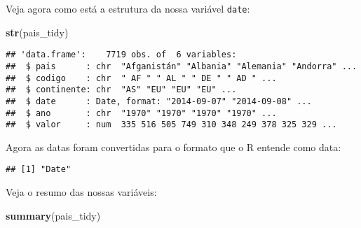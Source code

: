 \documentclass[]{book}
\newenvironment{Shaded}{\begin{snugshade}}{\end{snugshade}}
\newcommand{\KeywordTok}[1]{\textcolor[rgb]{0.13,0.29,0.53}{\textbf{#1}}}
\newcommand{\NormalTok}[1]{#1}
\newcommand{\OperatorTok}[1]{\textcolor[rgb]{0.81,0.36,0.00}{\textbf{#1}}}
\newcommand{\StringTok}[1]{\textcolor[rgb]{0.31,0.60,0.02}{#1}}
\theoremstyle{definition}
\theoremstyle{definition}
\theoremstyle{definition}
\theoremstyle{remark}
\begin{document}
\begin{Shaded}
\end{Shaded}

Veja agora como está a estrutura da nossa variável \texttt{date}:

\begin{Shaded}
\begin{Highlighting}[]
\KeywordTok{str}\NormalTok{(pais_tidy)}
\end{Highlighting}
\end{Shaded}

\begin{verbatim}
## 'data.frame':    7719 obs. of  6 variables:
##  $ pais      : chr  "Afganistán" "Albania" "Alemania" "Andorra" ...
##  $ codigo    : chr  " AF " " AL " " DE " " AD " ...
##  $ continente: chr  "AS" "EU" "EU" "EU" ...
##  $ date      : Date, format: "2014-09-07" "2014-09-08" ...
##  $ ano       : chr  "1970" "1970" "1970" "1970" ...
##  $ valor     : num  335 516 505 749 310 348 249 378 325 329 ...
\end{verbatim}

Agora as datas foram convertidas para o formato que o R entende como data:

\begin{Shaded}
\end{Shaded}

\begin{verbatim}
## [1] "Date"
\end{verbatim}

Veja o resumo das nossas variáveis:

\begin{Shaded}
\begin{Highlighting}[]
\KeywordTok{summary}\NormalTok{(pais_tidy)}
\end{Highlighting}
\end{Shaded}
\end{document}
